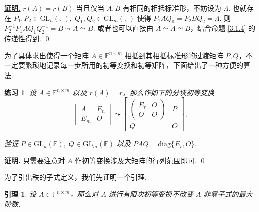 \documentclass[10pt,openany]{article}
\theoremstyle{thmstyle} %
\newtheorem{practice}{练习}[section]
\theoremstyle{defstyle} %
\newtheorem{lemma}[theorem]{引理}
\theoremstyle{prostyle} %
\theoremstyle{exastyle}
\theoremstyle{remstyle}
\renewenvironment{proof}[1][证明]{\par\underline{\textbf{#1.}} \;\fangsong}{\qed\par}
\newcommand{\F}{\mathbb{F}}
\newcommand{\gfn}{\text{GL}_n(\mathbb{F})}
\newcommand{\gfm}{\text{GL}_m(\mathbb{F})}
\newcommand{\nm}{^{n \times m}}
\newcommand{\diag}{\mathrm{diag}}
\begin{document}
\begin{proof}
	\( r(A)=r(B) \) 当且仅当 \( A,B \) 有相同的相抵标准形，不妨设为 \( \Lambda \). 也就存在 \( P_1,P_2 \in \gfn, \; Q_1,Q_2 \in \gfm \) 使得 \( P_1AQ_1=P_2BQ_2=\Lambda \). 则 \( P_2^{-1}P_1AQ_1Q_2^{-1}=B \leadsto A \simeq B \). 或者也可以直接由 \( A \simeq \Lambda \simeq B \)，结合命题 \ref{3.1.4} 的传递性得到.
\end{proof}

为了具体求出使得一个矩阵 \( A \in \F\nm \) 相抵到其相抵标准形的过渡矩阵 \( P,Q \)，不一定要繁琐地记录每一步所用的初等变换和初等矩阵，下面给出了一种方便的算法.

\begin{practice} \label{3.1}
	设 \( A \in \F\nm \) 以及 \( r(A)=r\)，那么作如下的分块初等变换
	\[ \begin{bmatrix}
		A & E_n \\
		E_m & O
	\end{bmatrix} \leadsto \begin{bmatrix}
	\begin{pmatrix}
		E_r & O \\
		O & O
	\end{pmatrix} & P \\
	Q & O
	\end{bmatrix}, \]
	
	验证 \( P \in \gfn, \; Q \in \gfm \) 以及 \( PAQ=\diag\{E_r,O\} \). 
\end{practice}

\begin{proof}
	只需要注意对 \( A \) 作初等变换涉及大矩阵的行列范围即可.
\end{proof}


为了引出秩的子式定义，我们先证明一个引理.

\begin{lemma} \label{3.1.8}
	设 \( A \in \F\nm \)，那么对 \( A \) 进行有限次初等变换不改变 \( A \) 非零子式的最大阶数.
\end{lemma}
\end{document}
